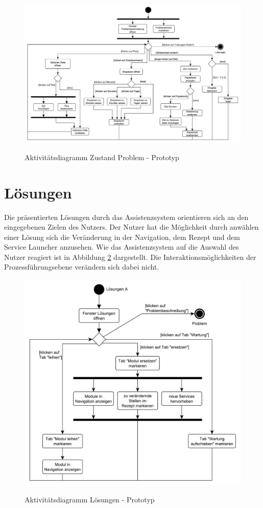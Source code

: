 \begin{figure}[htbp]
\centering
\includegraphics[angle=90,scale=0.5]{DA_files/UML/Prototyp/Aktivitaetsdiagramm-Problem.pdf}
\label{pic:Aktivitaetsdiagramm-Problem}
\caption{Aktivitätsdiagramm Zustand Problem - Prototyp}
\end{figure}

\section{Lösungen}
\label{5:Loesungen}
Die präsentierten Lösungen durch das Assistenzsystem orientieren sich an den eingegebenen Zielen des Nutzers. Der Nutzer hat die Möglichkeit durch anwählen einer Lösung sich die Veränderung in der Navigation, dem Rezept und dem Service Launcher anzusehen. Wie das Assistenzsystem auf die Auswahl des Nutzer reagiert ist in Abbildung \ref{pic:Aktivitaetsdiagramm-Loesungen} dargestellt. Die Interaktionsmöglichkeiten der Prozessführungsebene verändern sich dabei nicht.

\begin{figure}[htbp]
\centering
\includegraphics[scale=0.6]{DA_files/UML/Prototyp/Aktivitaetsdiagramm-Loesungen.pdf}
\label{pic:Aktivitaetsdiagramm-Loesungen}
\caption{Aktivitätsdiagramm Lösungen - Prototyp}
\end{figure}